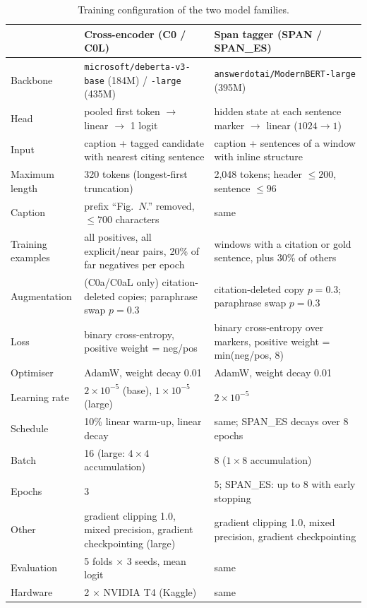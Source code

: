 \begin{table}[H]
\centering
\small
\begin{tabularx}{\linewidth}{lLL}
\toprule
 & Cross-encoder (C0 / C0L) & Span tagger (SPAN / SPAN\_ES)\\
\midrule
Backbone & \texttt{microsoft/deberta-v3-base} (184M) / \texttt{-large} (435M) & \texttt{answerdotai/ModernBERT-large} (395M)\\
Head & pooled first token $\rightarrow$ linear $\rightarrow$ 1 logit & hidden state at each sentence marker $\rightarrow$ linear ($1024\rightarrow1$)\\
Input & caption + tagged candidate with nearest citing sentence & caption + sentences of a window with inline structure\\
Maximum length & 320 tokens (longest-first truncation) & 2{,}048 tokens; header $\le200$, sentence $\le96$\\
Caption & prefix ``Fig.~$N$.'' removed, $\le700$ characters & same\\
Training examples & all positives, all explicit/near pairs, 20\% of far negatives per epoch & windows with a citation or gold sentence, plus 30\% of others\\
Augmentation & (C0a/C0aL only) citation-deleted copies; paraphrase swap $p=0.3$ & citation-deleted copy $p=0.3$; paraphrase swap $p=0.3$\\
Loss & binary cross-entropy, positive weight = neg/pos & binary cross-entropy over markers, positive weight = min(neg/pos, 8)\\
Optimiser & AdamW, weight decay 0.01 & AdamW, weight decay 0.01\\
Learning rate & $2\times10^{-5}$ (base), $1\times10^{-5}$ (large) & $2\times10^{-5}$\\
Schedule & 10\% linear warm-up, linear decay & same; SPAN\_ES decays over 8 epochs\\
Batch & 16 (large: $4\times4$ accumulation) & 8 ($1\times8$ accumulation)\\
Epochs & 3 & 5; SPAN\_ES: up to 8 with early stopping\\
Other & gradient clipping 1.0, mixed precision, gradient checkpointing (large) & gradient clipping 1.0, mixed precision, gradient checkpointing\\
Evaluation & 5 folds $\times$ 3 seeds, mean logit & same\\
Hardware & 2 $\times$ NVIDIA T4 (Kaggle) & same\\
\bottomrule
\end{tabularx}
\caption{Training configuration of the two model families.}
\end{table}

